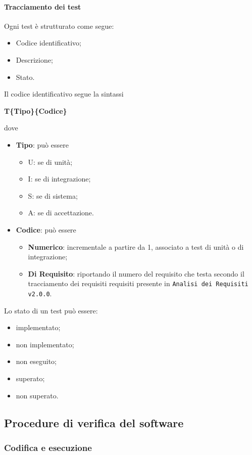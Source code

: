 \paragraph{Tracciamento dei test}
Ogni test è strutturato come segue:
\begin{itemize}
	\item Codice identificativo;
	\item Descrizione;
	\item Stato.
\end{itemize}
Il codice identificativo segue la sintassi 
\begin{center}
	\textbf{T\{Tipo\}\{Codice\}}
\end{center}
dove 
\begin{itemize}
	\item \textbf{Tipo}: può essere
		\begin{itemize}
			\item U: se di unità;
			\item I: se di integrazione;
			\item S: se di sistema;
			\item A: se di accettazione.
		\end{itemize}
	\item \textbf{Codice}: può essere
		\begin{itemize}
			\item \textbf{Numerico}: incrementale a partire da 1, associato a test di unità o di integrazione;
			\item \textbf{Di Requisito}: riportando il numero del requisito che testa secondo il tracciamento dei requisiti requisiti presente in \texttt{Analisi dei Requisiti v2.0.0}.
		\end{itemize}
\end{itemize}
	Lo stato di un test può essere:
\begin{itemize}
	\item implementato;
	\item non implementato;
	\item non eseguito;
	\item superato;
	\item non superato.
\end{itemize}
\subsection{Procedure di verifica del software}
\subsubsection{Codifica e esecuzione}
